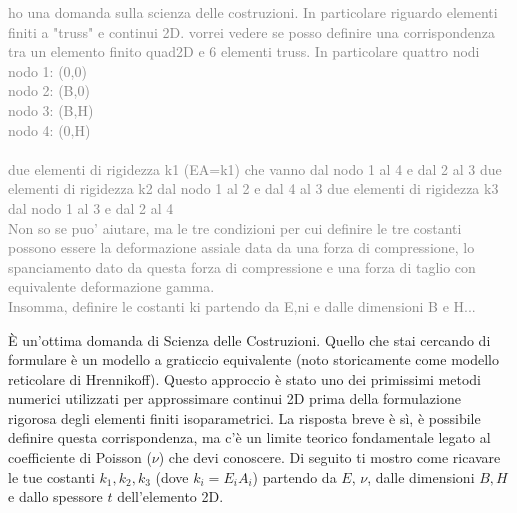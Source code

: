 \documentclass[a4paper]{article}
\begin{document}
\textcolor{gray}{ho una domanda sulla scienza delle costruzioni.
In particolare riguardo elementi finiti a "truss" e continui 2D.
vorrei vedere se posso definire una corrispondenza tra un elemento finito quad2D e 6 elementi truss.
In particolare quattro nodi\\
nodo 1: (0,0)\\
nodo 2: (B,0)\\
nodo 3: (B,H)\\
nodo 4: (0,H)\\
\\
due elementi di rigidezza k1 (EA=k1) che vanno dal nodo 1 al 4 e dal 2 al 3
due elementi di rigidezza k2 dal nodo 1 al 2 e dal 4 al 3
due elementi di rigidezza k3 dal nodo 1 al 3 e dal 2 al 4
\\
Non so se puo' aiutare, ma le tre condizioni per cui definire le tre costanti possono essere la deformazione assiale data da una forza di compressione, lo spanciamento dato da questa forza di compressione e una forza di taglio con equivalente deformazione gamma.
\\
Insomma, definire le costanti ki partendo da E,ni e dalle dimensioni B e H... }



\bigskip



È un'ottima domanda di Scienza delle Costruzioni. Quello che stai cercando di formulare è un modello a graticcio equivalente (noto storicamente come modello reticolare di Hrennikoff). Questo approccio è stato uno dei primissimi metodi numerici utilizzati per approssimare continui 2D prima della formulazione rigorosa degli elementi finiti isoparametrici.
La risposta breve è sì, è possibile definire questa corrispondenza, ma c'è un limite teorico fondamentale legato al coefficiente di Poisson ($\nu$) che devi conoscere.
Di seguito ti mostro come ricavare le tue costanti $k_1, k_2, k_3$ (dove $k_i = E_i A_i$) partendo da $E$, $\nu$, dalle dimensioni $B, H$ e dallo spessore $t$ dell'elemento 2D.
\end{document}
